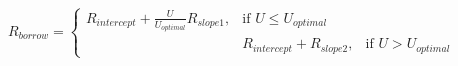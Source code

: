 \documentclass[preview]{standalone}
\begin{document}
\begin{align*}
R _{borrow} = \begin{cases}  R _{intercept} + \frac{U}{U_{optimal}} R _{slope1}, & \text{if } U \leq U_{optimal} \\ & R _{intercept} +  R _{slope2}, & \text{if } U > U_{optimal}  \end{cases}
\end{align*}
\end{document}
